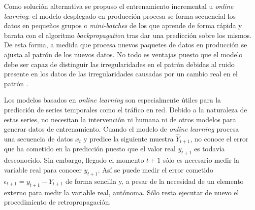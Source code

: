 Como solución alternativa se propuso el entrenamiento incremental u \textit{online learning}: el modelo desplegado en producción procesa se forma secuencial los datos en pequeños grupos o \textit{mini-batches} de los que aprende de forma rápida y barata con el algoritmo \textit{backpropagation} tras dar una predicción sobre los mismos. De esta forma, a medida que procesa nuevos paquetes de datos en producción se ajusta al patrón de los nuevos datos. No todo es ventajas puesto que el modelo debe ser capaz de distinguir las irregularidades en el patrón debidas al ruido presente en los datos de las irregularidades causadas por un cambio real en el patrón \cite{conceptdrift,conceptdrift1,conceptdrift2}.

Los modelos basados en \textit{online learning} son especialmente útiles para la predicción de series temporales como el tráfico en red. Debido a la naturaleza de estas series, no necesitan la intervención ni humana ni de otros modelos para generar datos de entrenamiento. Cuando el modelo de \textit{online learning} procesa una secuencia de datos $x_t$ y predice la siguiente muestra $\hat{Y}_{t+1}$, no conoce el error que ha cometido en la predicción puesto que el valor real $y_{t+1}$ es todavía desconocido. Sin embargo, llegado el momento $t+1$ sólo es necesario medir la variable real para conocer $y_{t+1}$. Así se puede medir el error cometido $\epsilon_{t+1}=y_{t+1}-\hat{Y}_{t+1}$ de forma sencilla y, a pesar de la necesidad de un elemento externo para medir la variable real, autónoma. Sólo resta ejecutar de nuevo el procedimiento de retropropagación.



